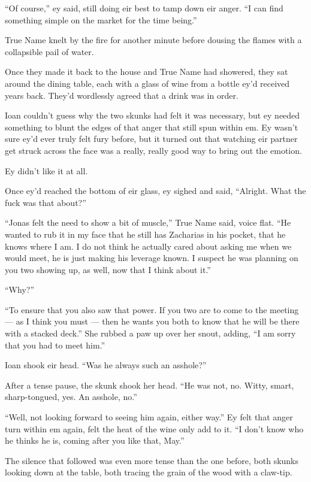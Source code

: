 ``Of course,'' ey said, still doing eir best to tamp down eir anger. ``I can find something simple on the market for the time being.''

True Name knelt by the fire for another minute before dousing the flames with a collapsible pail of water.

Once they made it back to the house and True Name had showered, they sat around the dining table, each with a glass of wine from a bottle ey'd received years back. They'd wordlessly agreed that a drink was in order.

Ioan couldn't guess why the two skunks had felt it was necessary, but ey needed something to blunt the edges of that anger that still spun within em. Ey wasn't sure ey'd ever truly felt fury before, but it turned out that watching eir partner get struck across the face was a really, really good way to bring out the emotion.

Ey didn't like it at all.

Once ey'd reached the bottom of eir glass, ey sighed and said, ``Alright. What the fuck was that about?''

``Jonas felt the need to show a bit of muscle,'' True Name said, voice flat. ``He wanted to rub it in my face that he still has Zacharias in his pocket, that he knows where I am. I do not think he actually cared about asking me when we would meet, he is just making his leverage known. I suspect he was planning on you two showing up, as well, now that I think about it.''

``Why?''

``To ensure that you also saw that power. If you two are to come to the meeting — as I think you must — then he wants you both to know that he will be there with a stacked deck.'' She rubbed a paw up over her snout, adding, ``I am sorry that you had to meet him.''

Ioan shook eir head. ``Was he always such an asshole?''

After a tense pause, the skunk shook her head. ``He was not, no. Witty, smart, sharp-tongued, yes. An asshole, no.''

``Well, not looking forward to seeing him again, either way.'' Ey felt that anger turn within em again, felt the heat of the wine only add to it. ``I don't know who he thinks he is, coming after you like that, May.''

The silence that followed was even more tense than the one before, both skunks looking down at the table, both tracing the grain of the wood with a claw-tip.

